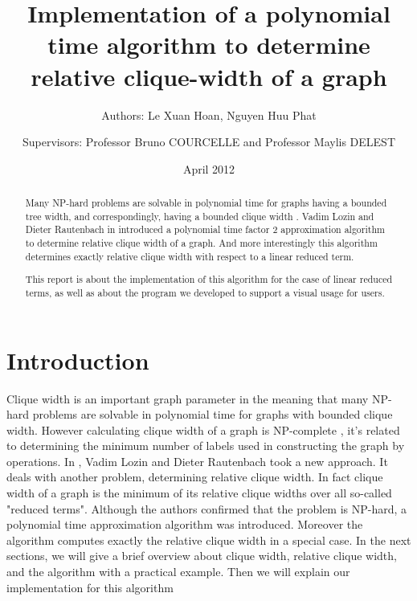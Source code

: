 \documentclass[a4paper, 12pt]{article}
\begin{document}
\title {Implementation of a polynomial time algorithm to determine relative clique-width of a graph}
\date{April 2012}
\author{Authors: Le Xuan Hoan, Nguyen Huu Phat \\
        \and 
	Supervisors: Professor Bruno COURCELLE and Professor Maylis DELEST}
\maketitle

\begin{abstract}
Many NP-hard problems are solvable in polynomial time for graphs having a bounded tree width, and correspondingly, having a bounded clique width \cite{vadim-lozin}. Vadim Lozin and Dieter Rautenbach in \cite{vadim-lozin} introduced a polynomial time factor 2 approximation algorithm to determine relative clique width of a graph. And more interestingly this algorithm determines exactly relative clique width with respect to a linear reduced term.

This report is about the implementation of this algorithm for the case of linear reduced terms, as well as about the program we developed to support a visual usage for users.
\end{abstract}

\section {Introduction}
Clique width \cite{linear-time} is an important graph parameter in the meaning that many NP-hard problems are solvable in polynomial time for graphs with bounded clique width. However calculating clique width of a graph is NP-complete \cite {np-complete}, it's related to determining the minimum number of labels used in constructing the graph by operations. In \cite {vadim-lozin},  Vadim Lozin and Dieter Rautenbach took a new approach. It deals with another problem, determining relative clique width. In fact clique width of a graph is the minimum of its relative clique widths over all so-called "reduced terms".
\newline\newline Although the authors confirmed that the problem is NP-hard, a polynomial time approximation algorithm was introduced. Moreover the algorithm computes exactly the relative clique width in a special case.
\newline\newline In the next sections, we will give a brief overview about clique width, relative clique width, and the algorithm with a practical example. Then we will explain our implementation for this algorithm
\end{document}
